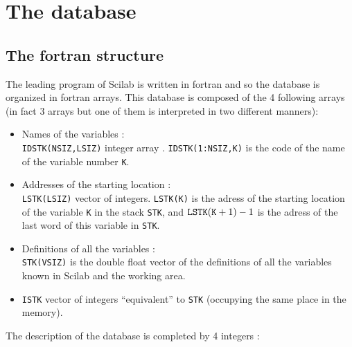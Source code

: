 \section{The database}
\subsection{The fortran structure }
The leading program of Scilab is written in fortran and so the database is
organized in fortran arrays. This database is composed of the 4 following 
arrays (in fact 3 arrays but one of them is interpreted in two different
manners):

%
\begin{itemize}

\item Names of the variables : \\
{\tt IDSTK(NSIZ,LSIZ)} integer array .  
{\tt IDSTK(1:NSIZ,K)} 
is the code of the name of the variable number {\tt K}.

\item Addresses of the starting location : \\
{\tt LSTK(LSIZ)}  vector of 
integers.     {\tt LSTK(K)} is the adress
of the starting location of the variable {\tt K} in the stack
 {\tt STK}, and ${\tt LSTK}({\tt K}+1)-1$ is the adress
of the last word of this variable in {\tt STK}.

\item Definitions of all the variables : \\
{\tt  STK(VSIZ)}  is the double float vector 
of the definitions of all the variables known in Scilab and the working area.

\item{\tt ISTK} vector of integers ``equivalent'' to {\tt STK} (occupying
the same place in the memory).

\end{itemize}
%

The description of the database is completed by 4 integers :



